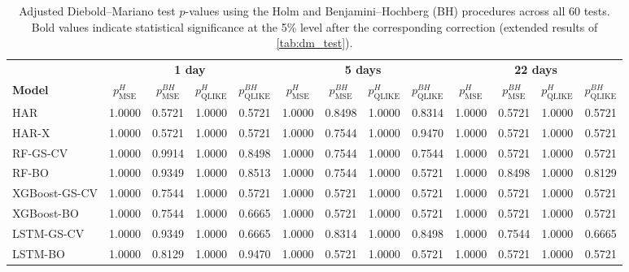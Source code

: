 \begin{table}[H]
\centering
\scriptsize
\setlength{\tabcolsep}{3pt}
\caption{Adjusted Diebold--Mariano test $p$-values using the
Holm and Benjamini--Hochberg (BH) procedures across all 60 tests.
Bold values indicate statistical significance at the 5\% level
after the corresponding correction (extended results of \autoref{tab:dm_test}).}
\label{tab:dm_adjusted}
\begin{tabular*}{\linewidth}{@{\extracolsep{\fill}} l cccc cccc cccc @{}}
\toprule
& \multicolumn{4}{c}{\textbf{1 day}}
& \multicolumn{4}{c}{\textbf{5 days}}
& \multicolumn{4}{c}{\textbf{22 days}} \\
\cmidrule(lr){2-5} \cmidrule(lr){6-9} \cmidrule(lr){10-13}
\textbf{Model}
& $p_{\text{MSE}}^{H}$ & $p_{\text{MSE}}^{BH}$
& $p_{\text{QLIKE}}^{H}$ & $p_{\text{QLIKE}}^{BH}$
& $p_{\text{MSE}}^{H}$ & $p_{\text{MSE}}^{BH}$
& $p_{\text{QLIKE}}^{H}$ & $p_{\text{QLIKE}}^{BH}$
& $p_{\text{MSE}}^{H}$ & $p_{\text{MSE}}^{BH}$
& $p_{\text{QLIKE}}^{H}$ & $p_{\text{QLIKE}}^{BH}$ \\
\midrule
HAR
& 1.0000 & 0.5721 & 1.0000 & 0.5721 & 1.0000 & 0.8498 & 1.0000 & 0.8314 & 1.0000 & 0.5721 & 1.0000 & 0.5721 \\

HAR-X
& 1.0000 & 0.5721 & 1.0000 & 0.5721 & 1.0000 & 0.7544 & 1.0000 & 0.9470 & 1.0000 & 0.5721 & 1.0000 & 0.5721 \\

RF-GS-CV
& 1.0000 & 0.9914 & 1.0000 & 0.8498 & 1.0000 & 0.7544 & 1.0000 & 0.7544 & 1.0000 & 0.5721 & 1.0000 & 0.5721 \\

RF-BO
& 1.0000 & 0.9349 & 1.0000 & 0.8513 & 1.0000 & 0.7544 & 1.0000 & 0.5721 & 1.0000 & 0.8498 & 1.0000 & 0.8129 \\

XGBoost-GS-CV
& 1.0000 & 0.7544 & 1.0000 & 0.5721 & 1.0000 & 0.5721 & 1.0000 & 0.5721 & 1.0000 & 0.5721 & 1.0000 & 0.5721 \\

XGBoost-BO
& 1.0000 & 0.7544 & 1.0000 & 0.6665 & 1.0000 & 0.5721 & 1.0000 & 0.5721 & 1.0000 & 0.5721 & 1.0000 & 0.5721 \\

LSTM-GS-CV
& 1.0000 & 0.9349 & 1.0000 & 0.6665 & 1.0000 & 0.8314 & 1.0000 & 0.8498 & 1.0000 & 0.7544 & 1.0000 & 0.6665 \\

LSTM-BO
& 1.0000 & 0.8129 & 1.0000 & 0.9470 & 1.0000 & 0.5721 & 1.0000 & 0.5721 & 1.0000 & 0.5721 & 1.0000 & 0.5721 \\


\end{tabular*}
\end{table}
